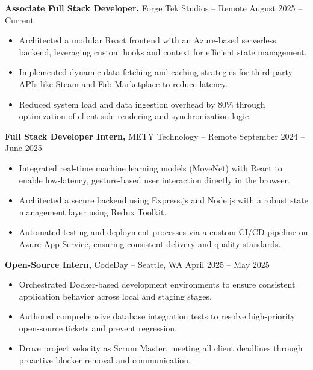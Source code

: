 \documentclass[11pt]{article}       %
\begin{document}
\textbf{Associate Full Stack Developer,} {Forge Tek Studios} -- Remote \hfill August 2025 -- Current \\
\vspace{-9pt}
\begin{itemize}
  \item Architected a modular React frontend with an Azure-based serverless backend, leveraging custom hooks and context for efficient state management.
  \item Implemented dynamic data fetching and caching strategies for third-party APIs like Steam and Fab Marketplace to reduce latency.
  \item Reduced system load and data ingestion overhead by 80\% through optimization of client-side rendering and synchronization logic.
\end{itemize}

\textbf{Full Stack Developer Intern,} {METY Technology} -- Remote \hfill September 2024 -- June 2025 \\
\vspace{-9pt}
\begin{itemize}
  \item Integrated real-time machine learning models (MoveNet) with React to enable low-latency, gesture-based user interaction directly in the browser.
  \item Architected a secure backend using Express.js and Node.js with a robust state management layer using Redux Toolkit.
  \item Automated testing and deployment processes via a custom CI/CD pipeline on Azure App Service, ensuring consistent delivery and quality standards.
\end{itemize}

\textbf{Open-Source Intern,} {CodeDay} -- Seattle, WA \hfill April 2025 -- May 2025 \\
\vspace{-9pt}
\begin{itemize}
  \item Orchestrated Docker-based development environments to ensure consistent application behavior across local and staging stages.
  \item Authored comprehensive database integration tests to resolve high-priority open-source tickets and prevent regression.
  \item Drove project velocity as Scrum Master, meeting all client deadlines through proactive blocker removal and communication.
\end{itemize}
\end{document}
